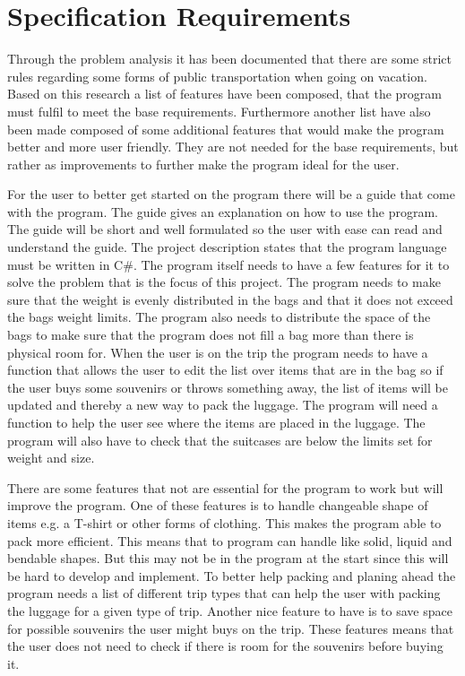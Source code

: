 \section{Specification Requirements}
\label{sec:Spec}
Through the problem analysis it has been documented that there are some strict rules regarding some forms of public transportation when going on vacation. Based on this research a list of features have been composed, that the program must fulfil to meet the base requirements.
Furthermore another list have also been made composed of some additional features that would make the program better and more user friendly. They are not needed for the base requirements, but rather as improvements to further make the program ideal for the user.

For the user to better get started on the program there will be a guide that come with the program. The guide gives an explanation on how to use the program. The guide will be short and well formulated so the user with ease can read and understand the guide.
The project description states that the program language must be written in C\#.
The program itself needs to have a few features for it to solve the problem that is the focus of this project. The program needs to make sure that the weight is evenly distributed in the bags and that it does not exceed the bags weight limits. The program also needs to distribute the space of the bags to make sure that the program does not fill a bag more than there is physical room for.
When the user is on the trip the program needs to have a function that allows the user to edit the list over items that are in the bag so if the user buys some souvenirs or throws something away, the list of items will be updated and thereby a new way to pack the luggage.
The program will need a function to help the user see where the items are placed in the luggage.
The program will also have to check that the suitcases are below the limits set for weight and size.


There are some features that not are essential for the program to work but will improve the program. One of these features is to handle changeable shape of items e.g. a T-shirt or other forms of clothing. This makes the program able to pack more efficient. This means that to program can handle like solid, liquid and bendable shapes. But this may not be in the program at the start since this will be hard to develop and implement.
To better help packing and planing ahead the program needs a list of different trip types that can help the user with packing the luggage for a given type of trip.
Another nice feature to have is to save space for possible souvenirs the user might buys on the trip. These features means that the user does not need to check if there is room for the souvenirs before buying it.

